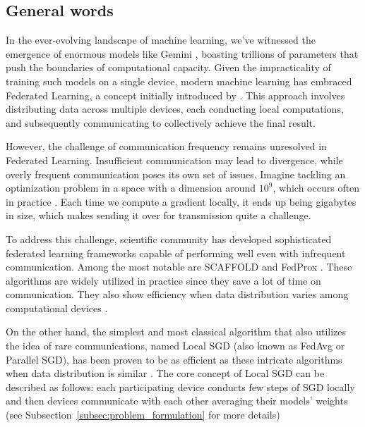 \subsection{General words}

In the ever-evolving landscape of machine learning, we've witnessed the emergence of enormous models like Gemini \citep{gemini}, boasting trillions of parameters that push the boundaries of computational capacity. Given the impracticality of training such models on a single device, modern machine learning has embraced Federated Learning, a concept initially introduced by \cite{konecny}. This approach involves distributing data across multiple devices, each conducting local computations, and subsequently communicating to collectively achieve the final result.

\vspace{10pt}

However, the challenge of communication frequency remains unresolved in Federated Learning. Insufficient communication may lead to divergence, while overly frequent communication poses its own set of issues. Imagine tackling an optimization problem in a space with a dimension around $10^9$, which occurs often in practice \citep{shahid2021communication}. Each time we compute a gradient locally, it ends up being gigabytes in size, which makes sending it over for transmission quite a challenge.

\vspace{10pt}

To address this challenge, scientific community has developed sophisticated federated learning frameworks capable of performing well even with infrequent communication. Among the most notable are SCAFFOLD \citep{Scaffold} and FedProx \citep{FedProx}. These algorithms are widely utilized in practice since they save a lot of time on communication. They also show efficiency when data distribution varies among computational devices \citep{Hospitals}.

\vspace{10pt}

On the other hand, the simplest and most classical algorithm that also utilizes the idea of rare communications, named Local SGD (also known as FedAvg or Parallel SGD), has been proven to be as efficient as these intricate algorithms when data distribution is similar \citep{Scaffold}. 
The core concept of Local SGD can be described as follows: each participating device conducts few steps of SGD locally and then devices communicate with each other averaging their models' weights (see Subsection~\ref{subsec:problem_formulation} for more details)

